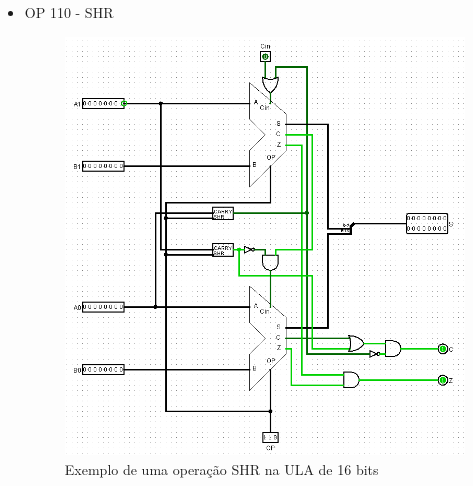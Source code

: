 \documentclass[
	12pt,				%
	openright,			%
	twoside,			%
	a4paper,			%
	english,			%
	french,				%
	spanish,			%
	brazil,				%
	]{abntex2}
\begin{document}
\begin{apendicesenv}
\begin{itemize}
\newpage
\item{OP 110 - SHR}
\begin{figure}[h]
	\begin{center}
	    \includegraphics[scale=0.6]{ULA16SHR.png}
	\end{center}
\caption{\label{ula16shr}Exemplo de uma operação SHR na ULA de 16 bits}
\end{figure}


\end{itemize}
\end{apendicesenv}
\end{document}
